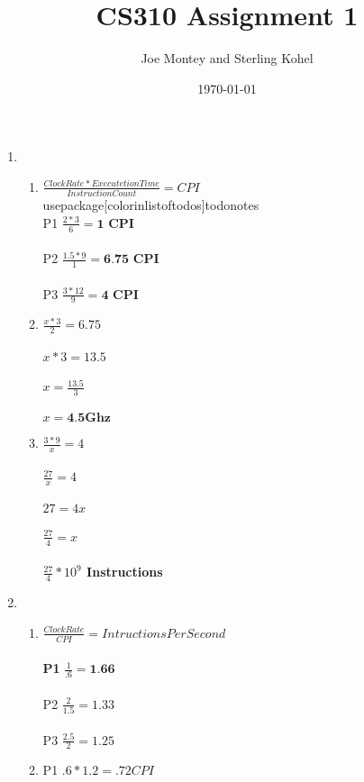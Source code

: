 \documentclass[a4paper]{article}
\title{CS310 Assignment 1}
\author{Joe Montey and Sterling Kohel}
\date{\today}
\begin{document}
\maketitle

\begin{enumerate}
\item 
\begin{enumerate}
\item $ \frac {Clock Rate * Executetion Time}{Instruction Count} = CPI$
\\usepackage[colorinlistoftodos]{todonotes}
\\
P1 $\frac {2*3}{6} = \textbf{1 CPI}$
\\
\\
P2 $\frac {1.5*9}{1} = \textbf{6.75 CPI}$
\\
\\
P3 $\frac {3*12}{9} = \textbf{4 CPI}$
\\
\item $\frac {x*3}{2} = 6.75$
\\
\\
$x*3 = 13.5$
\\
\\
$x = \frac {13.5}{3}$
\\
\\
$x = \textbf{4.5Ghz}$
\item $\frac {3*9}{x} = 4$
\\
\\
$\frac {27}{x} = 4$
\\
\\
$27 = 4x$
\\
\\
$\frac {27}{4} = x$
\\
\\
\textbf{$\frac {27}{4} * 10^9$ Instructions}
\\
\end{enumerate}
\item
\begin{enumerate}
\item $ \frac {Clock Rate}{CPI} = Intructions Per Second $
\\
\\
\textbf{P1} $\frac {1}{.6} = \textbf{1.66}$
\\
\\
P2 $\frac {2}{1.5} = 1.33$
\\
\\
P3 $\frac {2.5}{2} = 1.25$
\\
\item P1 $.6 * 1.2 = .72 CPI$

\end{enumerate}
\end{enumerate}
\end{document}
